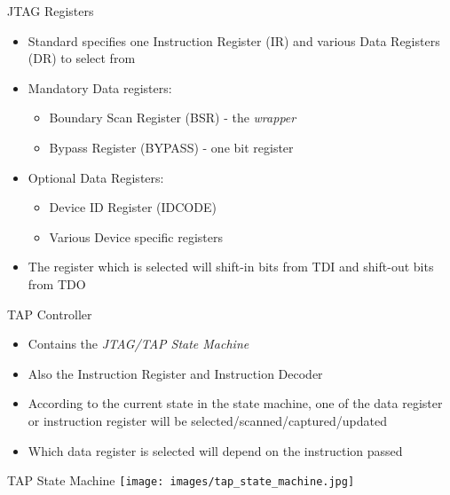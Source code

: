 \documentclass{beamer}
\begin{document}
\begin{frame}{JTAG Registers}
    \begin{itemize}
    \item Standard specifies one Instruction Register (IR) and various 
        Data Registers (DR) to select from
    \item Mandatory Data registers:
        \begin{itemize}
        \item Boundary Scan Register (BSR) - the \emph{wrapper}
        \item Bypass Register (BYPASS) - one bit register
        \end{itemize}
    \item Optional Data Registers:
        \begin{itemize}
        \item Device ID Register (IDCODE)
        \item Various Device specific registers
        \end{itemize}
    \item The register which is selected will shift-in bits from TDI and shift-out
        bits from TDO
    \end{itemize}
\end{frame}

\begin{frame}{TAP Controller}
    \begin{itemize}
    \item Contains the \emph{JTAG/TAP State Machine}
    \item Also the Instruction Register and Instruction Decoder
    \item According to the current state in the state machine, one of the data 
        register or instruction register will be selected/scanned/captured/updated
    \item Which data register is selected will depend on the instruction passed
    \end{itemize}
\end{frame}

\begin{frame}{TAP State Machine}
    \texttt{[image: images/tap\_state\_machine.jpg]}
\end{frame}
\end{document}

